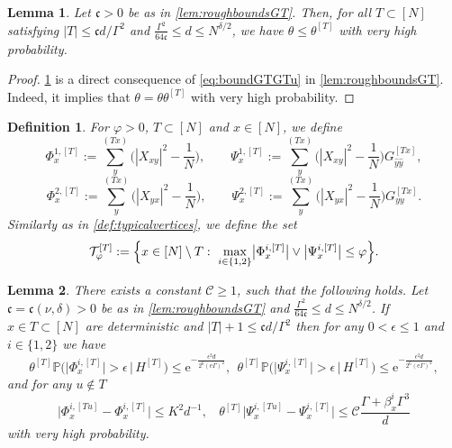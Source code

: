 \documentclass[10pt,a4paper]{amsart}
\newcommand{\ee}{\mathrm{e}}
\newcommand{\abs}[1]{\left| #1 \right|}
\newcommand{\absn}[1]{\bigl| #1 \bigr|} %
\newtheorem{lemma}{Lemma}[section]
\newtheorem{defi}{Definition}[section]
\numberwithin{equation}{section}
\newcommand*\bset[1]{[#1]}
\newcommand*\ubarr[1]{{\widehat{#1}}}
\begin{document}
	\begin{lemma}\label{lem:corthetalethetaT}
		Let $\mathfrak c >0$ be as in \cref{lem:roughboundsGT}. Then, for all $T \subset [N]$ satisfying $\abs{T} \leq \mathfrak c d/\Gamma^2$ and $ \frac{\Gamma^2}{64 \mathfrak c} \leq d \leq N^{\delta/2}$, we have $\theta \le \theta^{\bset{T}}$ with very high probability. 
	\end{lemma}
	\begin{proof}
		\cref{lem:corthetalethetaT} is a direct consequence of \cref{eq:boundGTGTu} in \cref{lem:roughboundsGT}. Indeed, it implies that $\theta = \theta \theta^{\bset{T}}$ with very high probability.
	\end{proof}
		\begin{defi}\label{def:typicalverticesdecoupled}
		For $\varphi >0$, $T \subset [N]$ and $x \in [N]$, we define
		\begin{equation*}
			\Phi^{1,\bset{T}}_x:= \sum_{y}^{(Tx)}\bigg(|X_{xy}|^2 - \frac{1}{N}\bigg), \qquad \Psi^{1,\bset{T}}_x:=  \sum_{y}^{(Tx)}\bigg(|X_{xy}|^2 - \frac{1}{N}\bigg) G^{\bset{Tx}}_{\ubarr{y}\ubarr{y}},
		\end{equation*}
		\begin{equation*}
			\Phi^{2,\bset{T}}_x:= \sum_{y}^{(Tx)}\bigg(|X_{yx}|^2 - \frac{1}{N}\bigg),\qquad \Psi^{2,\bset{T}}_x:=  \sum_{y}^{(Tx)}\bigg(|X_{yx}|^2 - \frac{1}{N}\bigg) G^{\bset{Tx}}_{yy}.
		\end{equation*}
		Similarly as in \cref{def:typicalvertices}, we define the set
		\begin{equation*}
			\mathcal{T}^{\bset{T}}_{\varphi} := \Bigl\{ x \in [N]\setminus T :~\max_{i \in \{1,2\}}\absn{\Phi^{i,\bset{T}}_x}\vee \absn{\Psi^{i,\bset{T}}_x }\le \varphi\Bigr\}.
		\end{equation*}
	\end{defi}

	\begin{lemma}\label{lemma:conditionalpbestimates}
		There exists a constant $\mathcal{C}\ge 1$, such that the following holds. Let $\mathfrak{c} = \mathfrak{c}(\nu, \delta)>0$ be as in \cref{lem:roughboundsGT} and $ \frac{\Gamma^2}{64 \mathfrak c} \leq d \leq N^{\delta/2}$. If $x \in T \subset [N]$ are deterministic and $\abs{T} +1\le \mathfrak{c}d/\Gamma^2$ then for any $0 < \epsilon \le 1$ and $i \in \{1,2\}$ we have
		\begin{equation}\label{eq:decoupledpbcondi}
			\theta^{\bset{T}} \mathbb{P} \big( \big |\Phi_x^{i,\bset{T}}\big| > \epsilon \, \big| \, H^{\bset{T}} \big) \le \ee^{-\frac{ \epsilon^2 d}{2^6(\ee\Gamma)^2}}, ~~ \theta^{\bset{T}} \mathbb{P} \big( \big|\Psi_x^{i,\bset{T}}\big| > \epsilon \, \big| \, H^{\bset{T}} \big) \le    \ee^{-\frac{ \epsilon^2 d}{2^6(\ee\Gamma)^2}},
		\end{equation}
	and for any $u \notin T$
		\begin{equation}\label{eq:accroissementPhiPsiT}
			\big| \Phi_x^{i,\bset{Tu}} - \Phi_x^{i,\bset{T}} \big| \le K^2d^{-1},~~~~ \theta^{\bset{T}}\big|\Psi_x^{i,\bset{Tu}} - \Psi_x^{i,\bset{T}}\big| \le \mathcal{C}  \frac{\Gamma + \beta^{i}_x\Gamma^3}{d}
		\end{equation}
		with very high probability.
	\end{lemma}
\end{document}
